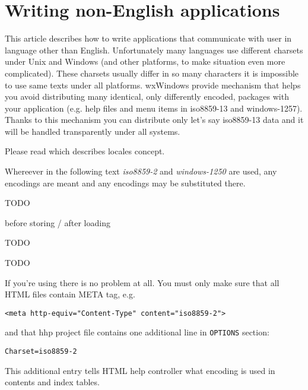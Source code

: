 \section{Writing non-English applications}\label{nonenglishoverview}

This article describes how to write applications that communicate with
user in language other than English. Unfortunately many languages use
different charsets under Unix and Windows (and other platforms, to make
situation even more complicated). These charsets usually differ in so
many characters it is impossible to use same texts under all platforms.
wxWindows provide mechanism that helps you avoid distributing many
identical, only differently encoded, packages with your application 
(e.g. help files and menu items in iso8859-13 and windows-1257). Thanks
to this mechanism you can distribute only let's say iso8859-13 data 
and it will be handled transparently under all systems.

Please read \label{internationalization} which
describes locales concept.

Whereever in the following text {\it iso8859-2} and {\it windows-1250} are
used, any encodings are meant and any encodings may be substituted there.



TODO


before storing / after loading

TODO


TODO


If you're using  there is
no problem at all. You must only make sure that all HTML files contain
META tag, e.g.

\begin{verbatim}
<meta http-equiv="Content-Type" content="iso8859-2">
\end{verbatim}

and that hhp project file contains one additional line in {\tt OPTIONS}
section:

\begin{verbatim}
Charset=iso8859-2
\end{verbatim}

This additional entry tells HTML help controller what encoding is used
in contents and index tables.

